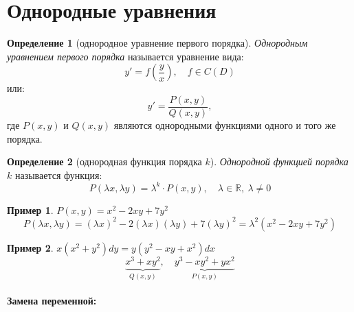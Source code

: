 \documentclass[11pt,a4paper,oneside]{report}
\theoremstyle{definition}
\newtheorem{definition}{Определение}[section]
\newtheorem{example}{Пример}
\theoremstyle{plain}
\theoremstyle{remark}
\begin{document}
\section{Однородные уравнения}

\begin{definition}[однородное уравнение первого порядка]
    \emph{Однородным уравнением первого порядка} называется уравнение вида:
    \begin{equation}\label{eq6}
        y' = f\left(\frac{y}{x}\right),\quad f\in C(D)
    \end{equation}
    или:
    \begin{equation}\label{eq7}
        y'=\frac{P(x,y)}{Q(x,y)},
    \end{equation}
    где $P(x,y)$ и $Q(x,y)$ являются однородными функциями одного и того же порядка.
\end{definition}

\begin{definition}[однородная функция порядка $k$]
    \emph{Однородной функцией порядка $k$} называется функция:
    \begin{equation*}
        P(\lambda x,\lambda y) = \lambda^k \cdot P(x,y),\quad \lambda \in \mathbb{R}, \ \lambda \ne 0
    \end{equation*}
\end{definition}

\begin{example}
    $P(x,y) = x^2 - 2xy + 7y^2$
    \begin{equation*}
        P(\lambda x,\lambda y) = (\lambda x)^2 - 2(\lambda x)(\lambda y) + 7(\lambda y)^2 = \lambda^2(x^2 - 2xy + 7y^2)
    \end{equation*}
\end{example}

\begin{example}
    $x(x^2 + y^2)dy = y(y^2 - xy + x^2)dx$
    \begin{equation*}
        \underbrace{x^3 + xy^2}_{Q(x,y)},\quad \underbrace{y^3 - xy^2 + yx^2}_{P(x,y)}
    \end{equation*}
\end{example}

\paragraph*{Замена переменной:}
\end{document}
